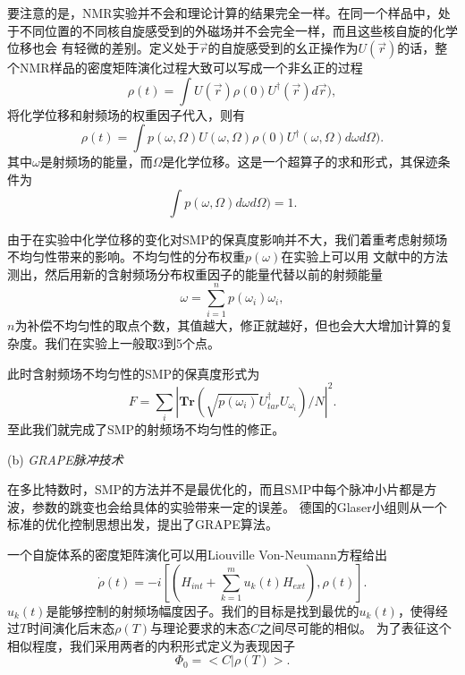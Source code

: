 要注意的是，NMR实验并不会和理论计算的结果完全一样。在同一个样品中，处于不同位置的不同核自旋感受到的外磁场并不会完全一样，而且这些核自旋的化学位移也会
有轻微的差别。定义处于$\overrightarrow{r}$的自旋感受到的幺正操作为$U(\overrightarrow{r})$的话，整个NMR样品的密度矩阵演化过程大致可以写成一个非幺正的过程
\begin{equation}\label{aaa}
\rho(t) = \int U(\overrightarrow{r})\rho(0)U^{\dagger}(\overrightarrow{r})d\overrightarrow{r}),
\end{equation}
将化学位移和射频场的权重因子代入，则有
\begin{equation}\label{aaa}
\rho(t) = \int p(\omega,\Omega)U(\omega,\Omega)\rho(0)U^{\dagger}(\omega,\Omega)d\omega d\Omega).
\end{equation}
其中$\omega$是射频场的能量，而$\Omega$是化学位移。这是一个超算子的求和形式，其保迹条件为
\begin{equation}\label{aaa}
\int p(\omega,\Omega)d\omega d\Omega) =1.
\end{equation}

由于在实验中化学位移的变化对SMP的保真度影响并不大，我们着重考虑射频场不均匀性带来的影响。不均匀性的分布权重$p(\omega)$在实验上可以用
文献中的方法测出\cite{smp5}，然后用新的含射频场分布权重因子的能量代替以前的射频能量
\begin{equation}\label{aaa}
\omega = \sum_{i = 1}^np(\omega_i)\omega_i,
\end{equation}
$n$为补偿不均匀性的取点个数，其值越大，修正就越好，但也会大大增加计算的复杂度。我们在实验上一般取3到5个点。

此时含射频场不均匀性的SMP的保真度形式为
\begin{equation}\label{aaa}
F = \sum_i|\textbf{Tr}(\sqrt{p(\omega_i)}U_{tar}^{\dagger}U_{\omega_i})/N|^2.
\end{equation}
至此我们就完成了SMP的射频场不均匀性的修正。

(b) \emph{GRAPE脉冲技术}

在多比特数时，SMP的方法并不是最优化的，而且SMP中每个脉冲小片都是方波，参数的跳变也会给具体的实验带来一定的误差。
德国的Glaser小组则从一个标准的优化控制思想出发，提出了GRAPE算法\cite{smp6}。

一个自旋体系的密度矩阵演化可以用Liouville Von-Neumann方程给出
\begin{equation}\label{aaa}
\dot{\rho}(t) = -i[(H_{int}+\sum_{k=1}^mu_k(t)H_{ext}),\rho(t)].
\end{equation}
$u_k(t)$是能够控制的射频场幅度因子。我们的目标是找到最优的$u_k(t)$，使得经过$T$时间演化后末态$\rho(T)$与理论要求的末态$C$之间尽可能的相似。
为了表征这个相似程度，我们采用两者的内积形式定义为表现因子
\begin{equation}\label{aaa}
\Phi_0 = <C|\rho(T)>.
\end{equation}

